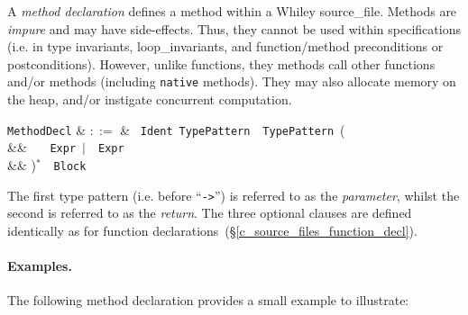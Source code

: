 A {\em method declaration} defines a method within a Whiley
\gls{source_file}.  Methods are {\em impure} and may have
side-effects.  Thus, they cannot be used within specifications
(i.e. in type invariants, \gls{loop_invariant}s, and function/method
\gls{precondition}s or \gls{postcondition}s).  However, unlike
functions, they methods call other functions and/or methods (including
\lstinline{native} methods).  They may also allocate memory on the
heap, and/or instigate concurrent computation.

\begin{syntax}
  \verb+MethodDecl+ & $::=$ & \ \verb+Ident+\
  \verb+TypePattern+\ \token{->}\ \verb+TypePattern+\ \big(\\
  && \ \ \ \verb+Expr+\ $|$\ \ \verb+Expr+\\
  && \big)$^*$\ \token{:}\ \verb+Block+\\
\end{syntax}

The first type pattern (i.e. before ``\lstinline{->}'') is referred to as the {\em parameter}, whilst the second is referred to as the {\em   return}.  The three optional clauses are defined identically as for function declarations~(\S\ref{c_source_files_function_decl}).

\paragraph{Examples.}  The following method declaration provides a
small example to illustrate:






